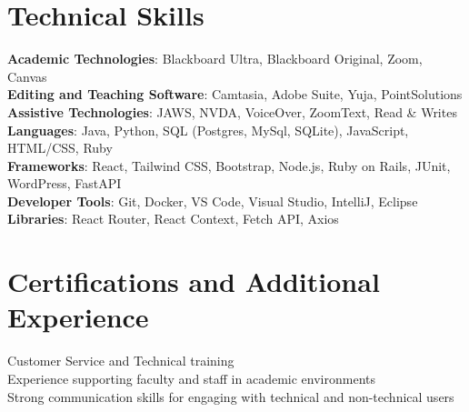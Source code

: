 \documentclass[letterpaper,11pt]{article}
\begin{document}
%
\section{Technical Skills}
 \begin{itemize}[leftmargin=0.15in, label={}]
    \small{\item{
    \textbf{Academic Technologies}{: Blackboard Ultra, Blackboard Original, Zoom, Canvas} \\
    \textbf{Editing and Teaching Software}{: Camtasia, Adobe Suite, Yuja, PointSolutions} \\
    \textbf{Assistive Technologies}{: JAWS, NVDA, VoiceOver, ZoomText, Read \& Writes} \\
     \textbf{Languages}{: Java, Python, SQL (Postgres, MySql, SQLite), JavaScript, HTML/CSS, Ruby} \\
     \textbf{Frameworks}{: React, Tailwind CSS, Bootstrap, Node.js, Ruby on Rails, JUnit, WordPress, FastAPI} \\
     \textbf{Developer Tools}{: Git, Docker, VS Code, Visual Studio, IntelliJ, Eclipse} \\
     \textbf{Libraries}{: React Router, React Context, Fetch API, Axios}
    }}
 \end{itemize}



\section{Certifications and Additional Experience}
 \begin{itemize}[leftmargin=0.15in, label={}]
    \small{\item{
    {Customer Service and Technical training} \\
    {Experience supporting faculty and staff in academic environments} \\
    {Strong communication skills for engaging with technical and non-technical users} \\
    }}
 \end{itemize}


\end{document}
